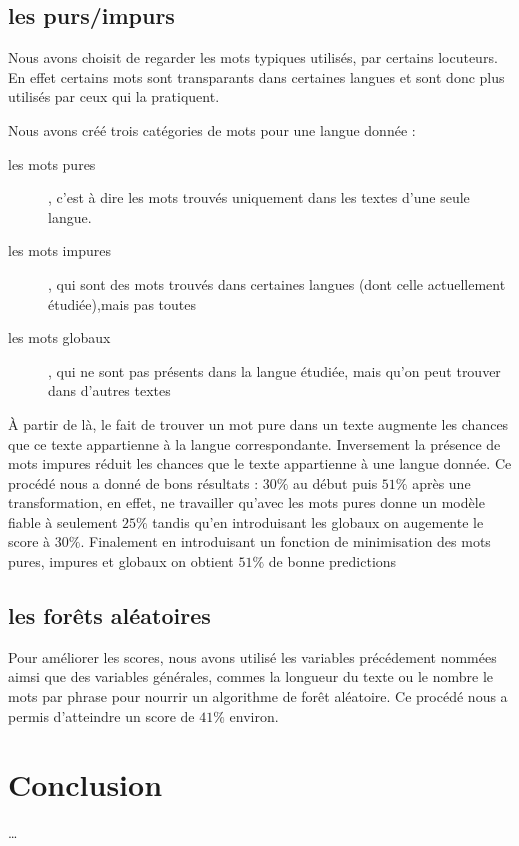 \documentclass[a4paper]{article}
\begin{document}
\subsection{les purs/impurs}
Nous avons choisit de regarder les mots typiques utilisés, par
certains locuteurs. En effet certains mots sont transparants dans
certaines langues et sont donc plus utilisés par ceux qui la
pratiquent.

Nous avons créé trois catégories de mots pour une langue donnée :
\begin{description}
\item[les mots pures], c'est à dire les mots trouvés uniquement dans
  les textes d'une seule langue.
\item[les mots impures], qui sont des mots trouvés dans certaines
  langues (dont celle actuellement étudiée),mais pas toutes
\item[les mots globaux], qui ne sont pas présents dans la langue
  étudiée, mais qu'on peut trouver dans d'autres textes
\end{description}
À partir de là, le fait de trouver un mot pure dans un texte augmente
les chances que ce texte appartienne à la langue correspondante.
Inversement la présence de mots impures réduit les chances que le
texte appartienne à une langue donnée.  Ce procédé nous a donné de
bons résultats : $30\%$ au début puis $51\%$ après une transformation,
en effet, ne travailler qu'avec les mots pures donne un modèle fiable
à seulement $25\%$ tandis qu'en introduisant les globaux on augemente
le score à $30\%$. Finalement en introduisant un fonction de
minimisation des mots pures, impures et globaux on obtient
$51\%$ de bonne predictions

\subsection{les forêts aléatoires}
Pour améliorer les scores, nous avons utilisé les variables
précédement nommées aimsi que des variables générales, commes la
longueur du texte ou le nombre le mots par phrase pour nourrir un
algorithme de forêt aléatoire. Ce procédé nous a permis d'atteindre un
score de $41\%$ environ.
\section{Conclusion}
…
\end{document}
